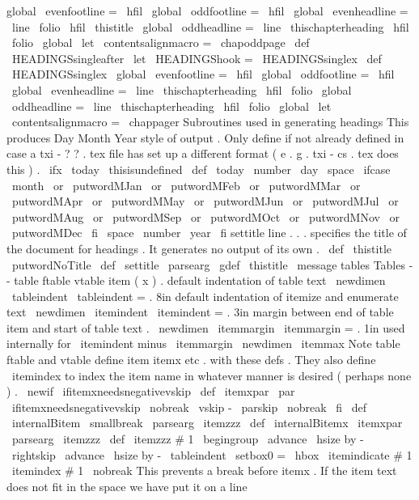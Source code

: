 {{{{{global
\
evenfootline
=
{
\
hfil
}
\
global
\
oddfootline
=
{
\
hfil
}
\
global
\
evenheadline
=
{
\
line
{
\
folio
\
hfil
\
thistitle
}
}
\
global
\
oddheadline
=
{
\
line
{
\
thischapterheading
\
hfil
\
folio
}
}
\
global
\
let
\
contentsalignmacro
=
\
chapoddpage
}
\
def
\
HEADINGSsingleafter
{
\
let
\
HEADINGShook
=
\
HEADINGSsinglex
}
\
def
\
HEADINGSsinglex
{
%
\
global
\
evenfootline
=
{
\
hfil
}
\
global
\
oddfootline
=
{
\
hfil
}
\
global
\
evenheadline
=
{
\
line
{
\
thischapterheading
\
hfil
\
folio
}
}
\
global
\
oddheadline
=
{
\
line
{
\
thischapterheading
\
hfil
\
folio
}
}
\
global
\
let
\
contentsalignmacro
=
\
chappager
}
%
Subroutines
used
in
generating
headings
%
This
produces
Day
Month
Year
style
of
output
.
%
Only
define
if
not
already
defined
in
case
a
txi
-
?
?
.
tex
file
has
set
%
up
a
different
format
(
e
.
g
.
txi
-
cs
.
tex
does
this
)
.
\
ifx
\
today
\
thisisundefined
\
def
\
today
{
%
\
number
\
day
\
space
\
ifcase
\
month
\
or
\
putwordMJan
\
or
\
putwordMFeb
\
or
\
putwordMMar
\
or
\
putwordMApr
\
or
\
putwordMMay
\
or
\
putwordMJun
\
or
\
putwordMJul
\
or
\
putwordMAug
\
or
\
putwordMSep
\
or
\
putwordMOct
\
or
\
putwordMNov
\
or
\
putwordMDec
\
fi
\
space
\
number
\
year
}
\
fi
%
settitle
line
.
.
.
specifies
the
title
of
the
document
for
headings
.
%
It
generates
no
output
of
its
own
.
\
def
\
thistitle
{
\
putwordNoTitle
}
\
def
\
settitle
{
\
parsearg
{
\
gdef
\
thistitle
}
}
\
message
{
tables
}
%
Tables
-
-
table
ftable
vtable
item
(
x
)
.
%
default
indentation
of
table
text
\
newdimen
\
tableindent
\
tableindent
=
.
8in
%
default
indentation
of
itemize
and
enumerate
text
\
newdimen
\
itemindent
\
itemindent
=
.
3in
%
margin
between
end
of
table
item
and
start
of
table
text
.
\
newdimen
\
itemmargin
\
itemmargin
=
.
1in
%
used
internally
for
\
itemindent
minus
\
itemmargin
\
newdimen
\
itemmax
%
Note
table
ftable
and
vtable
define
item
itemx
etc
.
with
%
these
defs
.
%
They
also
define
\
itemindex
%
to
index
the
item
name
in
whatever
manner
is
desired
(
perhaps
none
)
.
\
newif
\
ifitemxneedsnegativevskip
\
def
\
itemxpar
{
\
par
\
ifitemxneedsnegativevskip
\
nobreak
\
vskip
-
\
parskip
\
nobreak
\
fi
}
\
def
\
internalBitem
{
\
smallbreak
\
parsearg
\
itemzzz
}
\
def
\
internalBitemx
{
\
itemxpar
\
parsearg
\
itemzzz
}
\
def
\
itemzzz
#
1
{
\
begingroup
%
\
advance
\
hsize
by
-
\
rightskip
\
advance
\
hsize
by
-
\
tableindent
\
setbox0
=
\
hbox
{
\
itemindicate
{
#
1
}
}
%
\
itemindex
{
#
1
}
%
\
nobreak
%
This
prevents
a
break
before
itemx
.
%
%
If
the
item
text
does
not
fit
in
the
space
we
have
put
it
on
a
line
}}}}}
